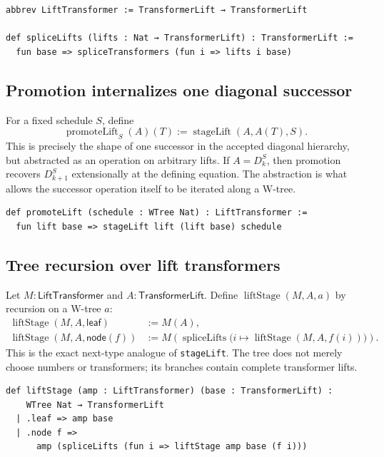 \documentclass[11pt]{article}
\theoremstyle{definition}
\theoremstyle{remark}
\newcommand{\TLift}{\mathsf{TransformerLift}}
\newcommand{\LLift}{\mathsf{LiftTransformer}}
\newcommand{\leanname}[1]{\nolinkurl{#1}}
\begin{document}
\begin{lstlisting}[caption={Coordinatewise splicing at the new type level.}]
abbrev LiftTransformer := TransformerLift → TransformerLift

def spliceLifts (lifts : Nat → TransformerLift) : TransformerLift :=
  fun base => spliceTransformers (fun i => lifts i base)
\end{lstlisting}

\subsection{Promotion internalizes one diagonal successor}

For a fixed schedule $S$, define
\[
  \operatorname{promoteLift}_S(A)(T)
  :=\operatorname{stageLift}(A,A(T),S).
\]
This is precisely the shape of one successor in the accepted diagonal
hierarchy, but abstracted as an operation on arbitrary lifts.  If $A=D^S_k$,
then promotion recovers $D^S_{k+1}$ extensionally at the defining equation.
The abstraction is what allows the successor operation itself to be iterated
along a W-tree.

\begin{lstlisting}[caption={One accepted hyperreflection successor, abstracted as a lift transformer.}]
def promoteLift (schedule : WTree Nat) : LiftTransformer :=
  fun lift base => stageLift lift (lift base) schedule
\end{lstlisting}

\subsection{Tree recursion over lift transformers}

Let $M:\LLift$ and $A:\TLift$.  Define
$\operatorname{liftStage}(M,A,a)$ by recursion on a W-tree $a$:
\begin{align*}
 \operatorname{liftStage}(M,A,\mathsf{leaf})
   &:= M(A),\\
 \operatorname{liftStage}(M,A,\mathsf{node}(f))
   &:=M\left(\operatorname{spliceLifts}
       \bigl(i\mapsto\operatorname{liftStage}(M,A,f(i))\bigr)\right).
\end{align*}
This is the exact next-type analogue of \leanname{stageLift}.  The tree does not
merely choose numbers or transformers; its branches contain complete
transformer lifts.

\begin{lstlisting}[caption={Well-founded tree reflection over complete transformer lifts.}]
def liftStage (amp : LiftTransformer) (base : TransformerLift) :
    WTree Nat → TransformerLift
  | .leaf => amp base
  | .node f =>
      amp (spliceLifts (fun i => liftStage amp base (f i)))
\end{lstlisting}
\end{document}
